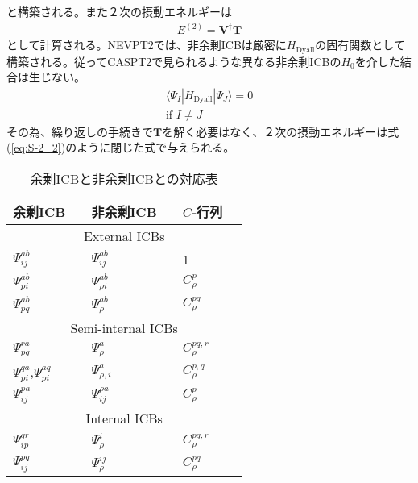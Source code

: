 \documentclass[11pt,pra,aps]{revtex4}
\begin{document}
と構築される。また２次の摂動エネルギーは
\begin{align}
  E^{(2)}=\mathbf{V}^\dagger\mathbf{T}
\end{align}
として計算される。NEVPT2では、非余剰ICBは厳密に$H_\text{Dyall}$の固有関数として構築される。従ってCASPT2で見られるような異なる非余剰ICBの$H_0$を介した結合は生じない。
\begin{align}
  \langle\Psi_I|H_\text{Dyall}|\Psi_J\rangle=0 \\ \text{if }I\neq J
\end{align}
その為、繰り返しの手続きで$\mathbf{T}$を解く必要はなく、２次の摂動エネルギーは式(\ref{eq:S-2_2})のように閉じた式で与えられる。

\begin{table}[h]
\caption{\label{tab:ICBs}
余剰ICBと非余剰ICBとの対応表
}
\begin{ruledtabular}
\begin{tabular}{llllll}
  余剰ICB          && 非余剰ICB        && $C$-行列 \\
  \hline
  \multicolumn{6}{c}{External ICBs} \\
  $\Psi_{ij}^{ab}$ && $\Psi_{ij}^{ab}$ && 1 \\
  $\Psi_{pi}^{ab}$ && $\Psi_{\rho i}^{ab}$ && $C_\rho^p$ \\
  $\Psi_{pq}^{ab}$ && $\Psi_{\rho}^{ab}$ && $C_\rho^{pq}$ \\
  \multicolumn{6}{c}{Semi-internal ICBs} \\
  $\Psi_{pq}^{ra}$ && $\Psi_{\rho}^{a}$ && $C_\rho^{pq,r}$ \\
  $\Psi_{pi}^{qa}$,$\Psi_{pi}^{aq}$ && $\Psi_{\rho,i}^{a}$ && $C_\rho^{p,q}$ \\
  $\Psi_{ij}^{pa}$ && $\Psi_{ij}^{\rho a}$ && $C_\rho^{p}$ \\  
  \multicolumn{6}{c}{Internal ICBs} \\
  $\Psi_{ip}^{qr}$ && $\Psi_{\rho}^{i}$ && $C_\rho^{pq,r}$ \\
  $\Psi_{ij}^{pq}$ && $\Psi_{\rho}^{ij}$ && $C_\rho^{pq}$ \\    
\end{tabular}
\end{ruledtabular}
\end{table}
\end{document}
